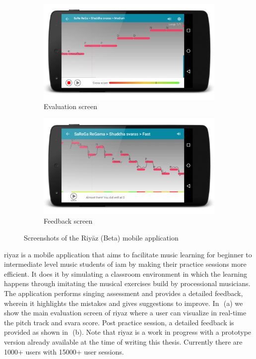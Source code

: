 \begin{figure}
	\begin{subfigure}{\textwidth}
			\centering
		\includegraphics[width=\figSizeSeventy]{ch08_applications/figures/riyaz1.png}
		\caption{Evaluation screen}
		\label{fig:riyaz_evaluation_screen}
	\end{subfigure}
	\begin{subfigure}{\textwidth}
			\centering
		\includegraphics[width=\figSizeSeventy]{ch08_applications/figures/riyaz2.png}
		\caption{Feedback screen}
		\label{fig:riyaz_feedback_screen}
	\end{subfigure}
	\caption{Screenshots of the Riy\={a}z (Beta) mobile application}
	\label{fig:riyaz_screens}
\end{figure}

\gls{riyaz} is a mobile application that aims to facilitate music learning for beginner to intermediate level music students of \gls{iam} by making their practice sessions more efficient. It does it by simulating a classroom environment in which the learning happens through imitating the musical exercises build by processional musicians. The application performs singing assessment and provides a detailed feedback, wherein it highlights the mistakes and gives suggestions to improve. In~\,(a) we show the main evaluation screen of \gls{riyaz} where a user can visualize in real-time the pitch track and \gls{svara} score. Post practice session, a detailed feedback is provided as shown in~\,(b).  Note that \gls{riyaz} is a work in progress with a prototype version already available at the time of writing this thesis. Currently there are 1000+ users with 15000+ user sessions. 



